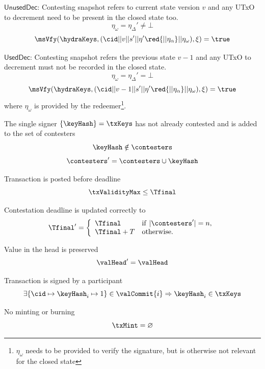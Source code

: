 \begin{menumerate}
\begin{menumerate}
	\item $\mathsf{UnusedDec}$: Contesting snapshot refers to current state version $v$ and any UTxO to decrement need to be present in the closed state too.
	\[
	  \eta_\omega = \eta_\Delta' \neq \bot
	\]
	\red{
	  \[
		\eta_\alpha = \bot
	  \]
	}
	\[
	  \msVfy(\hydraKeys,(\cid || v || s' || \eta' \red{|| \eta_\alpha} || \eta_\omega),\xi) = \true
	\]

	\item $\mathsf{UsedDec}$: Contesting snapshot refers the previous state $v - 1$ and any UTxO to decrement must not be recorded in the closed state.
	\[
	  \eta_\omega = \eta_\Delta' = \bot
	\]
	\red{
	  \[
		\eta_\alpha = \bot
	  \]
	}
	\[
	  \msVfy(\hydraKeys,(\cid || v - 1 || s' || \eta' \red{|| \eta_\alpha} || \eta_\omega),\xi) = \true
	\]
	where $\eta_\omega$ is provided by the redeemer\footnote{$\eta_\omega$ needs to be provided to verify the signature, but is otherwise not relevant for the closed state}.
  \end{menumerate}

  \item The single signer $\{\keyHash\} = \txKeys$ has not already contested and is added to the set of contesters
  \[
	\keyHash \notin \contesters
  \]
  \[
	\contesters' = \contesters \cup \keyHash
  \]
  \item Transaction is posted before deadline
  \[
	\txValidityMax \leq \Tfinal
  \]
  \item Contestation deadline is updated correctly to
  \[
	\Tfinal' = \left\{\begin{array}{ll}
	  \Tfinal     & \mathrm{if} ~ |\contesters'| = n, \\
	  \Tfinal + T & \mathrm{otherwise.}
	\end{array}\right.
\]
\item Value in the head is preserved
\[
  \valHead' = \valHead
\]
\item Transaction is signed by a participant
\[
  \exists \{\cid \mapsto \keyHash_{i} \mapsto 1\} \in \valCommit{i} \Rightarrow \keyHash_{i} \in \txKeys
\]
\item No minting or burning
\[
  \txMint = \varnothing
\]
\end{menumerate}

